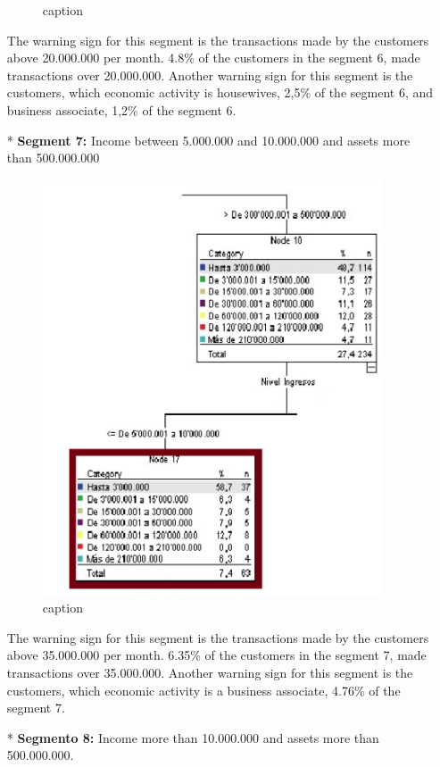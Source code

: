 \begin{itemize}
\begin{figure}[htbp]
  \caption{caption}
  \label{fig:label}
\end{figure}
The warning sign for this segment is the transactions made by the customers above 20.000.000 per month.  4.8\% of the customers in the segment 6, made transactions over 20.000.000.
Another warning sign for this segment is the customers, which economic activity is housewives, 2,5\% of the segment 6, and business associate, 1,2\% of the segment 6.
\item[*] \textbf{Segment 7:}
Income between 5.000.000 and 10.000.000 and assets more than 500.000.000
\begin{figure}[htbp]
  \centering
  \includegraphics[width=0.95\textwidth]{Segmento7}
  \caption{caption}
  \label{fig:label}
\end{figure}
The warning sign for this segment is the transactions made by the customers above 35.000.000 per month.  6.35\% of the customers in the segment 7, made transactions over 35.000.000.
Another warning sign for this segment is the customers, which economic activity is a business associate, 4.76\% of the segment 7.
\item[*] \textbf{Segmento 8:}
Income more than 10.000.000 and assets more than 500.000.000.

\end{itemize}

